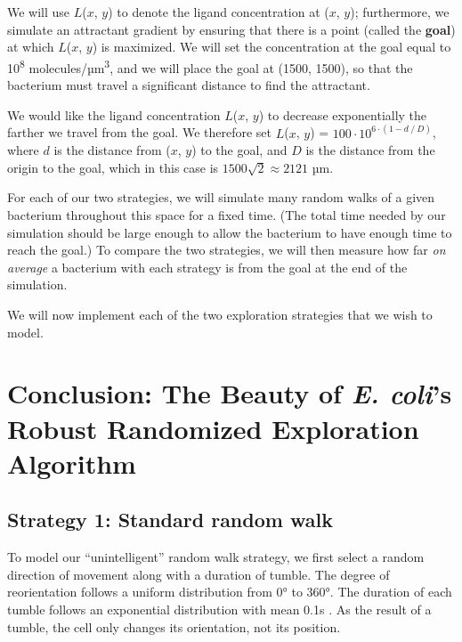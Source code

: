 We will use $L$($x$, $y$) to denote the ligand concentration at ($x$, $y$); furthermore, we simulate an attractant gradient by ensuring that there is a point (called the \textbf{goal}) at which $L$($x$, $y$) is maximized. We will set the concentration at the goal equal to 10\textsuperscript{8} molecules/µm\textsuperscript{3}, and we will place the goal at (1500, 1500), so that the bacterium must travel a significant distance to find the attractant.

We would like the ligand concentration $L$($x$, $y$) to decrease exponentially the farther we travel from the goal. We therefore set $L$($x$, $y$) = $100 \cdot 10^{6 \cdot (1-d\mathbin{/}D)}$, where $d$ is the distance from ($x$, $y$) to the goal, and $D$ is the distance from the origin to the goal, which in this case is $1500\sqrt{2} \approx 2121$ µm.\\

\begin{qbox}\end{qbox}

For each of our two strategies, we will simulate many random walks of a given bacterium throughout this space for a fixed time. (The total time needed by our simulation should be large enough to allow the bacterium to have enough time to reach the goal.) To compare the two strategies, we will then measure how far \textit{on average} a bacterium with each strategy is from the goal at the end of the simulation.

We will now implement each of the two exploration strategies that we wish to model.

\FloatBarrier
{}

\section{Conclusion: The Beauty of \textit{E. coli}'s Robust Randomized Exploration Algorithm}
\label{sec:conclusion}

\subsection{Strategy 1: Standard random walk}

To model our ``unintelligent'' random walk strategy, we first select a random direction of movement along with a duration of tumble. The degree of reorientation follows a uniform distribution from 0° to 360°. The duration of each tumble follows an exponential distribution with mean 0.1s \citep{Saragosti_2012}. As the result of a tumble, the cell only changes its orientation, not its position.

